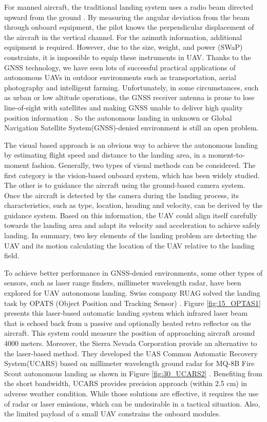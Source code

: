 \documentclass[journal,article,submit,moreauthors,pdftex,10pt,a4paper]{mdpi}
\begin{document}
For manned aircraft, the traditional landing system uses a radio beam directed upward from the ground \cite{mclean1990automatic, stevens2003aircraft}. By measuring the angular deviation from the beam through onboard equipment, the pilot knows the perpendicular displacement of the aircraft in the vertical channel. For the azimuth information, additional equipment is required. However, due to the size, weight, and power (SWaP) constraints, it is impossible to equip these instruments in UAV. Thanks to the GNSS technology, we have seen lots of successful practical applications of autonomous UAVs in outdoor environments such as transportation, aerial photography and intelligent farming. Unfortunately, in some circumstances, such as urban or low altitude operations, the GNSS receiver antenna is prone to lose line-of-sight with satellites and making GNSS unable to deliver high quality position information \cite{farrell1998gps}. So the autonomous landing in unknown or Global Navigation Satellite System(GNSS)-denied environment is still an open problem. 

The visual based approach is an obvious way to achieve the autonomous landing by estimating flight speed and distance to the landing area, in a moment-to-moment fashion. Generally, two types of visual methods can be considered. The first category is the vision-based onboard system, which has been widely studied. The other is to guidance the aircraft using the ground-based camera system. Once the aircraft is detected by the camera during the landing process, its characteristics, such as type, location, heading and velocity, can be derived by the guidance system. Based on this information, the UAV could align itself carefully towards the landing area and adapt its velocity and acceleration to achieve safely landing. In summary, two key elements of the landing problem are detecting the UAV and its motion calculating the location of the UAV relative to the landing field. 

To achieve better performance in GNSS-denied environments, some other types of sensors, such as laser range finders, millimeter wavelength radar, have been explored for UAV autonomous landing. Swiss company RUAG solved the landing task by OPATS (Object Position and Tracking Sensor) \cite{RUAG}. Figure \ref{fig:15_OPTAS1} presents this laser-based automatic landing system which infrared laser beam that is echoed back from a passive and optionally heated retro reflector on the aircraft. This system could measure the position of approaching aircraft around 4000 meters. Moreover, the Sierra Nevada Corporation provide an alternative to the laser-based method. They developed the UAS Common Automatic Recovery System(UCARS) \cite{UCARS} based on millimeter wavelength ground radar for MQ-8B Fire Scout autonomous landing as shown in Figure \ref{fig:30_UCARS2} . Benefiting from the short bandwidth, UCARS provides precision approach (within 2.5 cm) in adverse weather condition. While those solutions are effective, it requires the use of radar or laser emissions, which can be undesirable in a tactical situation. Also, the limited payload of a small UAV constrains the onboard modules.
\end{document}
